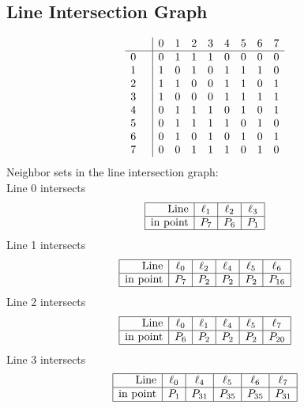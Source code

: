 \documentclass{article}
\begin{document}
{\subsection*{Line Intersection Graph}
{\arraycolsep=1pt
$$
\begin{array}{rr|*{8}r}
 &  & 0 & 1 & 2 & 3 & 4 & 5 & 6 & 7\\
\hline
0 &  & 0 & 1 & 1 & 1 & 0 & 0 & 0 & 0\\
1 &  & 1 & 0 & 1 & 0 & 1 & 1 & 1 & 0\\
2 &  & 1 & 1 & 0 & 0 & 1 & 1 & 0 & 1\\
3 &  & 1 & 0 & 0 & 0 & 1 & 1 & 1 & 1\\
4 &  & 0 & 1 & 1 & 1 & 0 & 1 & 0 & 1\\
5 &  & 0 & 1 & 1 & 1 & 1 & 0 & 1 & 0\\
6 &  & 0 & 1 & 0 & 1 & 0 & 1 & 0 & 1\\
7 &  & 0 & 0 & 1 & 1 & 1 & 0 & 1 & 0\\
\end{array}
$$
}%
Neighbor sets in the line intersection graph:\\
Line 0 intersects 
$$
\begin{array}{|r*{3}{|c}|}
\hline
\mbox{Line}  & \ell_{1} & \ell_{2} & \ell_{3}\\
\hline
\mbox{in point}  & P_{7} & P_{6} & P_{1}\\
\hline
\end{array}
$$
Line 1 intersects 
$$
\begin{array}{|r*{5}{|c}|}
\hline
\mbox{Line}  & \ell_{0} & \ell_{2} & \ell_{4} & \ell_{5} & \ell_{6}\\
\hline
\mbox{in point}  & P_{7} & P_{2} & P_{2} & P_{2} & P_{16}\\
\hline
\end{array}
$$
Line 2 intersects 
$$
\begin{array}{|r*{5}{|c}|}
\hline
\mbox{Line}  & \ell_{0} & \ell_{1} & \ell_{4} & \ell_{5} & \ell_{7}\\
\hline
\mbox{in point}  & P_{6} & P_{2} & P_{2} & P_{2} & P_{20}\\
\hline
\end{array}
$$
Line 3 intersects 
$$
\begin{array}{|r*{5}{|c}|}
\hline
\mbox{Line}  & \ell_{0} & \ell_{4} & \ell_{5} & \ell_{6} & \ell_{7}\\
\hline
\mbox{in point}  & P_{1} & P_{31} & P_{35} & P_{35} & P_{31}\\
\hline
\end{array}
$$}
\end{document}
